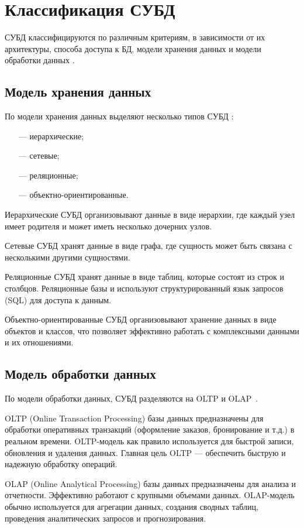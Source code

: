 \section{Классификация СУБД}
СУБД классифицируются по различным критериям, в зависимости от их архитектуры, способа доступа к БД, модели хранения данных и модели обработки данных \cite{src_db}.

\subsection{Модель хранения данных}
По модели хранения данных выделяют несколько типов СУБД \cite{src_db}:
\begin{itemize}
	\item[---] иерархические;
	\item[---] сетевые;
	\item[---] реляционные;
	\item[---] объектно-ориентированные.
\end{itemize}

Иерархические СУБД организовывают данные в виде иерархии, где каждый узел имеет родителя и может иметь несколько дочерних узлов.

Сетевые СУБД хранят данные в виде графа, где сущность может быть связана с несколькими другими сущностями.

Реляционные СУБД хранят данные в виде таблиц, которые состоят из строк и столбцов.
Реляционные базы и используют структурированный язык запросов (SQL) для доступа к данным.

Объектно-ориентированные СУБД организовывают хранение данных в виде объектов и классов, что позволяет эффективно работать с комплексными данными и их отношениями.

\subsection{Модель обработки данных}
По модели обработки данных, СУБД разделяются на OLTP и OLAP~\cite{src_olap_oltp}.

OLTP (Online Transaction Processing) базы данных предназначены для обработки оперативных транзакций (оформление заказов, бронирование и т.д.) в реальном времени.
OLTP-модель как правило используется для быстрой записи, обновления и удаления данных.
Главная цель OLTP --- обеспечить быструю и надежную обработку операций.

OLAP (Online Analytical Processing) базы данных предназначены для анализа и отчетности. Эффективно работают с крупными объемами данных.
OLAP-модель обычно используется для агрегации данных, создания сводных таблиц, проведения аналитических запросов и прогнозирования.

